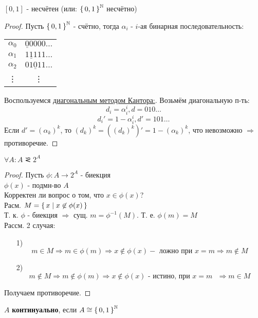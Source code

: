 \begin{theorem} [Кантора]
$[0, 1]$ - несчётен (или: $\set{0, 1}^{\mathbb{N}}$ несчётно)
\end{theorem}
\begin{proof}
Пусть $\set{0, 1}^{\mathbb{N}}$ - счётно, тогда $\alpha_i$ - $i$-ая бинарная последовательность:
\begin{center}
\begin{tabular}{ |c|c| } 
 \hline
 $\alpha_0$ & $\underline{0}0000\ldots$ \\
 $\alpha_1$ & $1\underline{1}111\ldots$ \\
 $\alpha_2$ & $01\underline{0}11\ldots$ \\
 \vdots & \vdots \\
 \hline
\end{tabular}
\end{center}
Воспользуемся \underline{диагональным методом Кантора:}. Возьмём диагональную п-ть:
\[
d_i = \alpha_i^{i}, d = 010\ldots
\]
\[
d_{i}' = 1 - \alpha_i^{i}, d' = 101\ldots
\]
Если $d' = (\alpha_{k}) ^{k}$, то $(d_{k}) ^{k} = ((d_{k}) ^{k})'  = 1 - (\alpha_{k}) ^{k}$, что невозможно $\Rightarrow$ противоречие.
\end{proof}
\begin{theorem}
$\forall A \colon A \simless 2^{A}$
\end{theorem}
\begin{proof}
Пусть $\phi: A \rightarrow 2^{A}$ - биекция \\
$\phi(x)$ - подмн-во $A$ \\
Корректен ли вопрос о том, что $x \in \phi(x)$? \\
Расм. $M = \set{x | x \not\in \phi(x)}$ \\
Т. к. $\phi$ - биекция $\Rightarrow$ сущ. $m = \phi^{-1}(M)$. Т. е. $\phi(m) = M$ \\
Рассм. 2 случая:
\begin{itemize}
  \item [1) ] \[
  m \in M \Rightarrow m \in \phi(m) \Rightarrow x \not\in \phi(x) - \text{ ложно при $x = m \Rightarrow$} m \not\in M
  \]
\item [2) ]\[
  m \not\in M \Rightarrow m \not\in \phi(m) \Rightarrow x \not\in \phi(x) \text{ - истино, при $x = m$ $\Rightarrow$} m \in M
\]
\end{itemize}
Получаем противоречие.
\end{proof}
\begin{definition}
$A$ \textbf{континуально}, если $A \cong \set{0, 1}^{\mathbb{N}}$
\end{definition}
